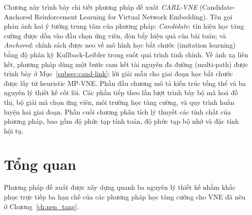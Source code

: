 \documentclass[../DoAn.tex]{subfiles}
\begin{document}
\let\savedaddcontentsline\addcontentsline
\renewcommand{\addcontentsline}[3]{%
  \def\carltmpa{#2}\def\carltmpb{subsection}%
  \ifx\carltmpa\carltmpb\else\savedaddcontentsline{#1}{#2}{#3}\fi}
\label{ch:de_xuat}

Chương này trình bày chi tiết phương pháp đề xuất \textit{CARL-VNE} (Candidate-Anchored Reinforcement Learning for Virtual Network Embedding). Tên gọi phản ánh hai ý tưởng trung tâm của phương pháp: \textit{Candidate}: tín hiệu học tăng cường được dồn vào đầu chọn ứng viên, đòn bẩy hiệu quả của bài toán; và \textit{Anchored}: chính sách được neo về mô hình học bắt chước (imitation learning) bằng độ phân kỳ Kullback-Leibler trong suốt quá trình tinh chỉnh. Về ánh xạ liên kết, phương pháp dùng một bước cam kết tài nguyên đa đường (multi-path) được trình bày ở Mục~\ref{subsec:cand-link}; lời giải mẫu cho giai đoạn học bắt chước được lấy từ heuristic MP-VNE. Phần đầu chương mô tả kiến trúc tổng thể và ba nguyên lý thiết kế cốt lõi. Các phần tiếp theo lần lượt trình bày bộ mã hoá đồ thị, bộ giải mã chọn ứng viên, môi trường học tăng cường, và quy trình huấn luyện hai giai đoạn. Phần cuối chương phân tích lý thuyết các tính chất của phương pháp, bao gồm độ phức tạp tính toán, độ phức tạp bộ nhớ và đặc tính hội tụ.

\section{Tổng quan}                  %
\label{sec:overview}

Phương pháp đề xuất được xây dựng quanh ba nguyên lý thiết kế nhằm khắc phục trực tiếp ba hạn chế của các phương pháp học tăng cường cho VNE đã nêu ở Chương~\ref{ch:nen_tang}.
\end{document}
